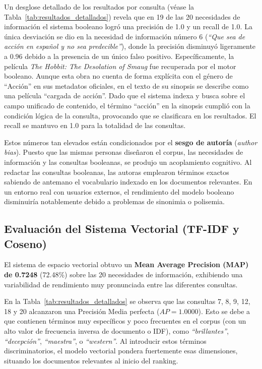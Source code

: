 \documentclass[conference,a4paper]{IEEEtran}
\begin{document}
Un desglose detallado de los resultados por consulta (véase la Tabla~\ref{tab:resultados_detallados}) revela que en 19 de las 20 necesidades de información el sistema booleano logró una precisión de 1.0 y un recall de 1.0. La única desviación se dio en la necesidad de información número 6 (\textit{``Que sea de acción en español y no sea predecible''}), donde la precisión disminuyó ligeramente a 0.96 debido a la presencia de un único falso positivo. Específicamente, la película \textit{The Hobbit: The Desolation of Smaug} fue recuperada por el motor booleano. Aunque esta obra no cuenta de forma explícita con el género de ``Acción'' en sus metadatos oficiales, en el texto de su sinopsis se describe como una película ``cargada de acción''. Dado que el sistema indexa y busca sobre el campo unificado de contenido, el término ``acción'' en la sinopsis cumplió con la condición lógica de la consulta, provocando que se clasificara en los resultados. El recall se mantuvo en 1.0 para la totalidad de las consultas.

Estos números tan elevados están condicionados por el \textbf{sesgo de autoría} (\textit{author bias}). Puesto que las mismas personas diseñaron el corpus, las necesidades de información y las consultas booleanas, se produjo un acoplamiento cognitivo. Al redactar las consultas booleanas, las autoras emplearon términos exactos sabiendo de antemano el vocabulario indexado en los documentos relevantes. En un entorno real con usuarios externos, el rendimiento del modelo booleano disminuiría notablemente debido a problemas de sinonimia o polisemia.

\subsection{Evaluación del Sistema Vectorial (TF-IDF y Coseno)}

El sistema de espacio vectorial obtuvo un \textbf{Mean Average Precision (MAP) de 0.7248} (72.48\%) sobre las 20 necesidades de información, exhibiendo una variabilidad de rendimiento muy pronunciada entre las diferentes consultas.

En la Tabla~\ref{tab:resultados_detallados} se observa que las consultas 7, 8, 9, 12, 18 y 20 alcanzaron una Precisión Media perfecta ($AP = 1.0000$). Esto se debe a que contienen términos muy específicos y poco frecuentes en el corpus (con un alto valor de frecuencia inversa de documento o IDF), como \textit{``brillantes''}, \textit{``decepción''}, \textit{``maestra''}, o \textit{``western''}. Al introducir estos términos discriminatorios, el modelo vectorial pondera fuertemente esas dimensiones, situando los documentos relevantes al inicio del ranking.
\end{document}
